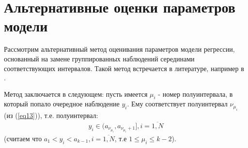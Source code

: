 



\section{Альтернативные оценки параметров модели}
Рассмотрим альтернативный метод оценивания параметров модели регрессии, основанный на замене группированных наблюдений серединами соответствующих интервалов. 
Такой метод встречается в литературе, например в \cite{interval_valued}.

Метод заключается в следующем:
пусть имеется $\mu_i$ - номер полуинтервала, в который попало очередное наблюдение $y_i$. Ему соответствует полуинтервал $\nu_{\mu_i}$ (из (\ref{eq13})), т.е. полуинтервал:
\begin{eqnarray}
    y_i\in (a_{\nu_{\mu_i}},a_{\nu_{\mu_i}+1}], i = \overline{1,N}
\end{eqnarray}
(считаем что $a_1<y_i<a_{k-1}, i=\overline{1,N}$, т.е $1\leq\mu_i\leq k-2$).

